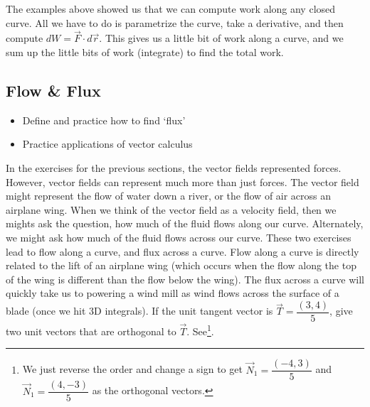 \documentclass[10pt,]{book}
\theoremstyle{plain}
\theoremstyle{definition}
\theoremstyle{definition}
\theoremstyle{definition}
\theoremstyle{definition}
\theoremstyle{definition}
\numberwithin{equation}{section}
\begin{document}
The examples above showed us that we can compute work along any closed curve. All we have to do is parametrize the curve, take a derivative, and then compute \(dW = \vec F \cdot d\vec r\). This gives us a little bit of work along a curve, and we sum up the little bits of work (integrate) to find the total work.%
\typeout{************************************************}
\typeout{************************************************}
\subsection[{Flow \& Flux}]{Flow \& Flux}\label{subsection-28}
\leavevmode%
\begin{itemize}[label=\textbullet]
\item{}Define and practice how to find `flux'%
\item{}Practice applications of vector calculus%
\end{itemize}
In the exercises for the previous sections, the vector fields represented forces. However, vector fields can represent much more than just forces. The vector field might represent the flow of water down a river, or the flow of air across an airplane wing. When we think of the vector field as a velocity field, then we mights ask the question, how much of the fluid flows along our curve. Alternately, we might ask how much of the fluid flows across our curve. These two exercises lead to flow along a curve, and flux across a curve. Flow along a curve is directly related to the lift of an airplane wing (which occurs when the flow along the top of the wing is different than the flow below the wing). The flux across a curve will quickly take us to powering a wind mill as wind flows across the surface of a blade (once we hit 3D integrals).%
If the unit tangent vector is \(\vec T = \dfrac{(3,4)}{5}\), give two unit vectors that are orthogonal to \(\vec T\). See\footnote{We just reverse the order and change a sign to get \(\vec N_1 = \dfrac{(-4,3)}{5}\) and \(\vec N_1 = \dfrac{(4,-3)}{5}\) as the orthogonal vectors.\label{fn-19}}.%
\end{document}
